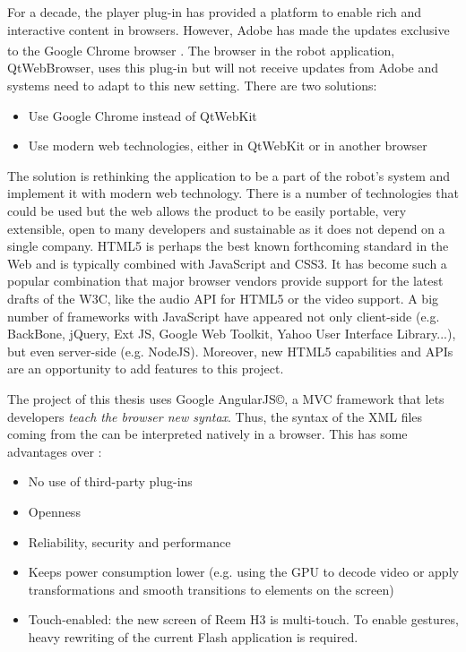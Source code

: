 For a decade, the \flash player plug-in has provided a platform to enable rich and interactive content in browsers.
However, Adobe has made the updates exclusive to the Google Chrome\textsuperscript{\textcopyright}\xspace browser \cite{FlashRoadmap}. 
The browser in the robot application, QtWebBrowser, uses this plug-in but will not receive updates from Adobe and \company systems need to adapt to this new setting. 
There are two solutions:
\begin{itemize}
	\item Use Google Chrome instead of QtWebKit
	\item Use modern web technologies, either in QtWebKit or in another browser
\end{itemize}

The solution is rethinking the application to be a part of the robot's system and implement it with modern web technology.
There is a number of technologies that could be used but the web allows the product to be easily portable, very extensible, open to many developers and sustainable as it does not depend on a single company.
\ac{HTML5} is perhaps the best known forthcoming standard in the Web and is typically combined with JavaScript and \ac{CSS3}. 
It has become such a popular combination that major browser vendors provide support for the latest drafts of the \ac{W3C}, like the audio \ac{API} for \ac{HTML5} or the video support.
A big number of frameworks with JavaScript have appeared not only client-side (e.g. BackBone, jQuery, Ext JS, Google Web Toolkit, Yahoo User Interface Library...), but even server-side (e.g. NodeJS).
Moreover, new \ac{HTML5} capabilities and \acp{API} are an opportunity to add features to this project.

The project of this thesis uses Google AngularJS\copyright, a \ac{MVC} framework that lets developers \emph{teach the browser new syntax}. 
Thus, the syntax of the \ac{XML} files coming from the \se can be interpreted natively in a browser. 
This has some advantages over \flash \cite{Jobs:ThoughtsOnFlash}:
\begin{itemize}
    \item No use of third-party plug-ins
    \item Openness
    \item Reliability, security and performance
    \item Keeps power consumption lower (e.g. using the GPU to decode video or apply transformations and smooth transitions to elements on the screen)
    \item Touch-enabled: the new screen of Reem H3 is multi-touch. To enable gestures, heavy rewriting of the current Flash application is required.
\end{itemize}

